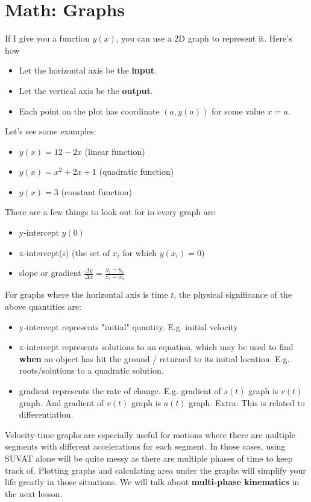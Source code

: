 \documentclass{article}
\begin{document}
\section{Math: Graphs}
If I give you a function $y(x)$, you can use a 2D graph to represent it. Here's how
\begin{itemize}
    \item Let the horizontal axis be the \textbf{input}.
    \item Let the vertical axis be the \textbf{output}.
    \item Each point on the plot has coordinate $(a,y(a))$ for some value $x=a$.
\end{itemize}
Let's see some examples: 
\begin{itemize}
    \item $y(x) = 12-2x$ (linear function)
    \item $y(x) = x^2 + 2x + 1$ (quadratic function)
    \item $y(x) = 3$ (constant function)
\end{itemize}
There are a few things to look out for in every graph are
\begin{itemize}
    \item y-intercept $y(0)$
    \item x-intercept(s) (the set of $x_i$ for which $y(x_i) = 0$)
    \item slope or gradient $\frac{\Delta y}{\Delta x} = \frac{y_1 - y_0}{x_1 - x_0}$
\end{itemize}
For graphs where the horizontal axis is time $t$, the physical significance of the above quantities are:
\begin{itemize}
    \item y-intercept represents "initial" quantity. E.g. initial velocity
    \item x-intercept represents solutions to an equation, which may be used to find \textbf{when} an object has hit the ground / returned to its initial location. E.g. roots/solutions to a quadratic solution. 
    \item gradient represents the rate of change. E.g. gradient of $s(t)$ graph is $v(t)$ graph. And gradient of $v(t)$ graph is $a(t)$ graph. Extra: This is related to differentiation.
\end{itemize}
\clearpage 
\noindent Velocity-time graphs are especially useful for motions where there are multiple segments with different accelerations for each segment. In those cases, using SUVAT alone will be quite messy as there are multiple phases of time to keep track of. Plotting graphs and calculating area under the graphs will simplify your life greatly in those situations. We will talk about \textbf{multi-phase kinematics} in the next lesson.
\end{document}
